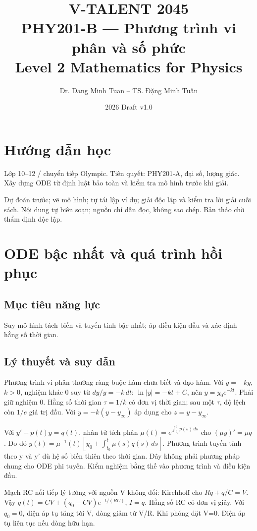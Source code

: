 \documentclass[11pt,a4paper,openany]{book}
\begin{document}
\title{V-TALENT 2045\\ PHY201-B --- Phương trình vi phân và số phức\\\large Level 2 \textbar{} Mathematics for Physics}
\author{Dr. Dang Minh Tuan -- TS. Đặng Minh Tuấn}
\date{2026 \textbar{} Draft v1.0}
\maketitle
\tableofcontents
\chapter*{Hướng dẫn học}
Lớp 10–12 / chuyển tiếp Olympic. Tiên quyết: PHY201-A, đại số, lượng giác. Xây dựng ODE từ định luật bảo toàn và kiểm tra mô hình trước khi giải.

Dự đoán trước; vẽ mô hình; tự tái lập ví dụ; giải độc lập và kiểm tra lời giải cuối sách. Nội dung tự biên soạn; nguồn chỉ dẫn đọc, không sao chép. Bản thảo chờ thẩm định độc lập.
\chapter{ODE bậc nhất và quá trình hồi phục}
\section{Mục tiêu năng lực}
Suy mô hình tách biến và tuyến tính bậc nhất; áp điều kiện đầu và xác định hằng số thời gian.
\section{Lý thuyết và suy dẫn}
Phương trình vi phân thường ràng buộc hàm chưa biết và đạo hàm. Với $\dot y=-ky$, $k>0$, nghiệm khác 0 suy từ $dy/y=-k\,dt$: $\ln|y|=-kt+C$, nên $y=y_0e^{-kt}$. Phải giữ nghiệm 0. Hằng số thời gian $\tau=1/k$ có đơn vị thời gian; sau một $\tau$, độ lệch còn $1/e$ giá trị đầu. Với $\dot y=-k(y-y_\infty)$ áp dụng cho $z=y-y_\infty$.

Với $y'+p(t)y=q(t)$, nhân tử tích phân $\mu(t)=e^{\int_{t_0}^{t}p(s)\,ds}$ cho $(\mu y)'=\mu q$. Do đó $y(t)=\mu^{-1}(t)[y_0+\int_{t_0}^t\mu(s)q(s)\,ds]$. Phương trình tuyến tính theo y và y' dù hệ số biến thiên theo thời gian. Đây không phải phương pháp chung cho ODE phi tuyến. Kiểm nghiệm bằng thế vào phương trình và điều kiện đầu.

Mạch RC nối tiếp lý tưởng với nguồn V không đổi: Kirchhoff cho $R\dot q+q/C=V$. Vậy $q(t)=CV+(q_0-CV)e^{-t/(RC)}$, $I=\dot q$. Hằng số RC có đơn vị giây. Với $q_0=0$, điện áp tụ tăng tới V, dòng giảm từ V/R. Khi phóng đặt V=0. Điện áp tụ liên tục nếu dòng hữu hạn.
\end{document}
